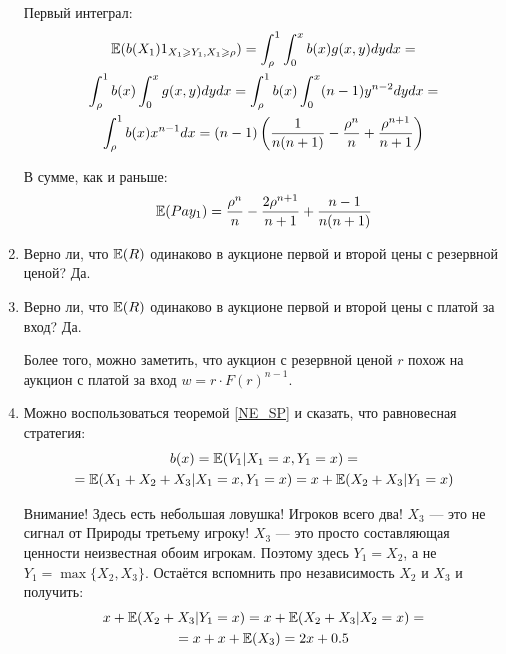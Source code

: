 \begin{enumerate}
Первый интеграл:
\begin{multline}
\mathbb{E}(b(X_{1})1_{X_{1}\geqslant Y_{1},X_{1}\geqslant \rho})=\int_{\rho}^{1} \int_{0}^{x} b(x)g(x,y)dy dx =\\
\int_{\rho}^{1} b(x) \int_{0}^{x} g(x,y)dy dx =\int_{\rho}^{1} b(x) \int_{0}^{x} (n-1) y^{n-2} dy dx =\\
\int_{\rho}^{1}b(x) x^{n-1} dx=(n-1)\left(\frac{1}{n(n+1)}-\frac{\rho^{n}}{n}+\frac{\rho^{n+1}}{n+1}\right)
\end{multline}

В сумме, как и раньше:
\begin{equation}
\mathbb{E}(Pay_{1})=\frac{\rho^{n}}{n}-\frac{2\rho^{n+1}}{n+1}+\frac{n-1}{n(n+1)}
\end{equation}

\item  Верно ли, что $ \mathbb{E}(R) $ одинаково в аукционе первой и второй цены с резервной ценой? Да.

\item  Верно ли, что $ \mathbb{E}(R) $ одинаково в аукционе первой и второй цены с платой за вход? Да.

Более того, можно заметить, что аукцион с резервной ценой $ r $ похож на аукцион с платой за вход $ w=r\cdot F(r)^{n-1} $.

\item %
Можно воспользоваться теоремой \ref{NE_SP} и сказать, что равновесная стратегия:
\begin{multline}
b(x)=\mathbb{E}(V_{1}|X_{1}=x,Y_{1}=x)=\\
=\mathbb{E}(X_{1}+X_{2}+X_{3}|X_{1}=x,Y_{1}=x)=x+\mathbb{E}(X_{2}+X_{3}|Y_{1}=x)
\end{multline}

Внимание! Здесь есть небольшая ловушка! Игроков всего два! $ X_{3} $ — это не сигнал от Природы третьему игроку! $ X_{3} $ — это просто составляющая ценности неизвестная обоим игрокам. Поэтому здесь $ Y_{1}=X_{2} $, а не $ Y_{1}=\max\{X_{2},X_{3}\} $. Остаётся вспомнить про независимость $ X_{2} $ и $ X_{3} $ и получить:
\begin{multline}
x+\mathbb{E}(X_{2}+X_{3}|Y_{1}=x)=x+\mathbb{E}(X_{2}+X_{3}|X_{2}=x)=\\
=x+x+\mathbb{E}(X_{3})=2x+0.5
\end{multline}


\end{enumerate}
